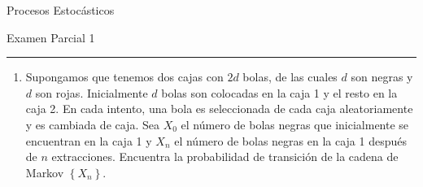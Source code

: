 \documentclass{report}
\begin{document}
\begin{center}
    \textsf{\Large Procesos Estocásticos}
    \par\medskip
    \textsf{\large Examen Parcial 1}
    \end{center}
    \hrule
    \par\bigskip

\begin{enumerate}
    \item Supongamos que tenemos dos cajas con $2d$ bolas,  de las cuales $d$ son negras y $d$ son rojas. Inicialmente $d$ bolas son colocadas en la caja 1 y el resto en la caja 2. En cada intento, una bola es seleccionada de cada caja aleatoriamente y es cambiada de caja. Sea $X_0$ el número de bolas negras que inicialmente se encuentran en la caja 1 y $X_n$ el número de bolas negras en la caja 1 después de $n$ extracciones. Encuentra la probabilidad de transición de la cadena de Markov $\left\{X_n\right\}$.


\end{enumerate}
\end{document}
